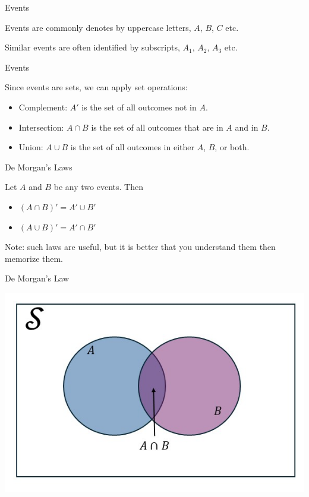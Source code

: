 \documentclass[aspectratio=169,xcolor=pdftex,dvipsnames,table]{beamer}\usepackage[]{graphicx}\usepackage[]{xcolor}
\begin{document}
\begin{frame}{Events}

Events are commonly denotes by uppercase letters, $A$, $B$, $C$ etc.

\bigskip

Similar events are often identified by subscripts, $A_1$, $A_2$, $A_3$ etc.
\end{frame}

\begin{frame}{Events}

Since events are sets, we can apply set operations:
\begin{itemize}
\item Complement: $A'$ is the set of all outcomes not in $A$.
\item Intersection: $A \cap B$ is the set of all outcomes that are in $A$ and in $B$.
\item Union: $A \cup B$ is the set of all outcomes in either $A$, $B$, or both. 
\end{itemize}

\end{frame}

\begin{frame}{De Morgan's Laws}

Let $A$ and $B$ be any two events. Then
\begin{itemize}
\item $(A \cap B)'= A' \cup B'$
\item $(A \cup B)'= A' \cap B'$
\end{itemize}

\bigskip

Note: such laws are useful, but it is better that you understand them then memorize them.
\end{frame}

\begin{frame}{De Morgan's Law}

\begin{center}
\includegraphics[width = .75\textwidth]{Figures/de_morgans_1_2/Slide1.JPG}
\end{center}
\end{frame}
\end{document}
